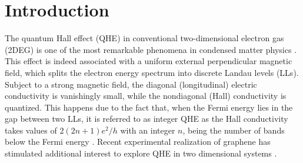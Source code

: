 \section{Introduction}

The quantum Hall effect (QHE) in conventional two-dimensional electron gas (2DEG) is one of the most remarkable phenomena in condensed matter physics \cite{QHE1}.
This effect is indeed associated with a uniform external perpendicular magnetic field, which splits the electron energy spectrum into discrete Landau levels (LLs).
Subject to a strong magnetic field, the diagonal (longitudinal) electric conductivity is vanishingly small, while the nondiagonal (Hall) conductivity is quantized.
This happens due to the fact that, when the Fermi energy lies in the gap between two LLs, it is referred to as integer QHE as the Hall conductivity takes values of $2(2n + 1)e^2/h$ with an integer $n$, being the number of bands below the Fermi energy \cite{QHE4}.
Recent experimental realization of graphene has stimulated additional interest to explore QHE in two dimensional systems \cite{QHE2, QHE3, QHE4}.

